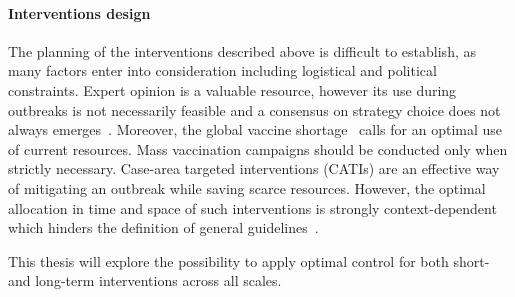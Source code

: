 \paragraph{Interventions design} The planning of the interventions described above is difficult to establish, as many factors enter into consideration including logistical and political constraints. Expert opinion is a valuable resource, however its use during outbreaks is not necessarily feasible and a consensus on strategy choice does not always emerges~\cite{cyranoski_cholera_2011}. Moreover, the global vaccine shortage~\cite{parker_adapting_2017,seidlein_preventing_2018} calls for an optimal use of current resources. Mass vaccination campaigns should be conducted only when strictly necessary. Case-area targeted interventions (CATIs) are an effective way of mitigating an outbreak while saving scarce resources. However, the optimal allocation in time and space of such interventions is strongly context-dependent which hinders the definition of general guidelines~\cite{eubank_modelling_2004, finger_potential_2018, seidlein_preventing_2018,azman_micro-hotspots_2018,lessler_mapping_2018,rebaudet_dry_2013}. 

This thesis will explore the possibility to apply optimal control for  both short- and long-term interventions across all scales. 